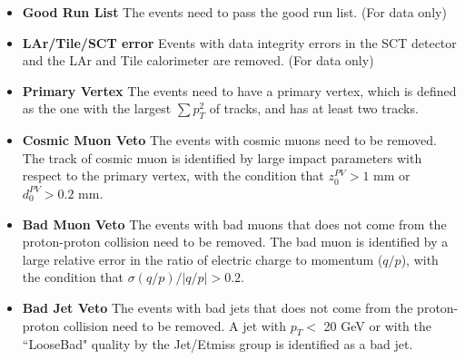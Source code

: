 \begin{itemize}
\item \textbf{Good Run List} The events need to pass the good run list. (For data only)
\item \textbf{LAr/Tile/SCT error} Events with data integrity errors in the SCT detector and the LAr and Tile calorimeter are removed. (For data only)
\item \textbf{Primary Vertex} The events need to have a primary vertex, which is defined as the one with the largest $\sum p_{T}^{2}$ of tracks, and has at least two tracks.
\item \textbf{Cosmic Muon Veto} The events with cosmic muons need to be removed. The track of cosmic muon is identified by large impact parameters with respect to the primary vertex, with the condition that $z_{0}^{PV}>1$ mm or $d_{0}^{PV}>0.2$ mm.
\item \textbf{Bad Muon Veto} The events with bad muons that does not come from the proton-proton collision need to be removed. The bad muon is identified by a large relative error in the ratio of electric charge to momentum ($q/p$), with the condition that $\sigma(q/p) / |q/p| > 0.2$.
\item \textbf{Bad Jet Veto} The events with bad jets that does not come from the proton-proton collision need to be removed. A jet with $p_{T}<$ 20 GeV or with the ``LooseBad" quality by the Jet/Etmiss group is identified as a bad jet.
\end{itemize}
